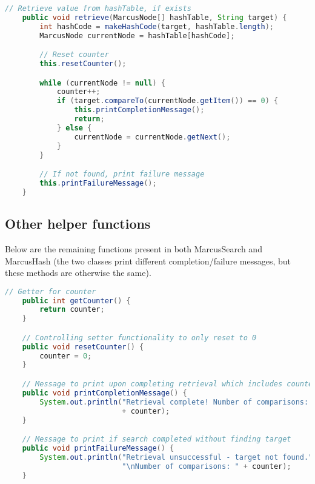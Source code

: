 \documentclass[letterpaper, 10pt]{article}
\begin{document}
\vspace{2.0em}

\begin{lstlisting}[language=Java, firstnumber=69]
    // Retrieve value from hashTable, if exists
    public void retrieve(MarcusNode[] hashTable, String target) {
        int hashCode = makeHashCode(target, hashTable.length);
        MarcusNode currentNode = hashTable[hashCode];

        // Reset counter
        this.resetCounter();

        while (currentNode != null) {
            counter++;
            if (target.compareTo(currentNode.getItem()) == 0) {
                this.printCompletionMessage();
                return;
            } else {
                currentNode = currentNode.getNext();
            }
        }

        // If not found, print failure message
        this.printFailureMessage();
    }
\end{lstlisting}


\subsection{Other helper functions}

\hspace{1.0em}Below are the remaining functions present in both MarcusSearch and MarcusHash (the two classes print different completion/failure messages, but these methods are otherwise the same).

\vspace{2.0em}

\begin{lstlisting}[language=Java, firstnumber=91]
    // Getter for counter
    public int getCounter() {
        return counter;
    }

    // Controlling setter functionality to only reset to 0
    public void resetCounter() {
        counter = 0;
    }

    // Message to print upon completing retrieval which includes counter
    public void printCompletionMessage() {
        System.out.println("Retrieval complete! Number of comparisons: "
                           + counter);
    }

    // Message to print if search completed without finding target
    public void printFailureMessage() {
        System.out.println("Retrieval unsuccessful - target not found." +
                           "\nNumber of comparisons: " + counter);
    }
\end{lstlisting}
\end{document}
